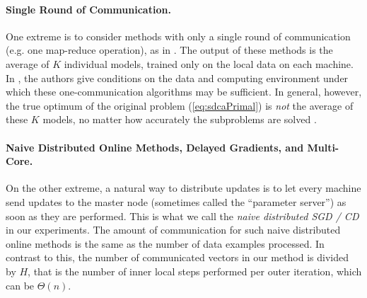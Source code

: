 \documentclass{article} %
\begin{document}
\paragraph{Single Round of Communication.} %
One extreme is to consider methods with only a single round of
communication (e.g. one map-reduce operation), as in
\cite{Zhang:2013wq, Zinkevich:2010tj,Mann:2009tr}.
The output of these methods is the average of $K$ individual models, trained only on the local data on each machine. In \cite{Zhang:2013wq}, the authors give conditions on the data and computing environment under which these one-communication algorithms may be sufficient. %
In general, however, the true optimum of the original problem (\ref{eq:sdcaPrimal})
is \emph{not} the average of these $K$ models, no matter how 
accurately the subproblems are solved \cite{Shamir:2014vf}.


\paragraph{Naive Distributed Online Methods, Delayed Gradients, and Multi-Core.}
On the other extreme, a natural way to distribute updates is to let every machine
send updates to the master node (sometimes called the ``parameter server'')
as soon as they are performed.
This is what we call the \emph{naive distributed SGD / CD} 
in our experiments. 
The amount of communication for such naive distributed online methods is 
the same as the number of data examples processed. In contrast to this, 
the number of communicated vectors in our method is divided by $H$, 
that is the number of inner local steps performed per outer iteration, which can 
be $\Theta(n)$.
\end{document}
